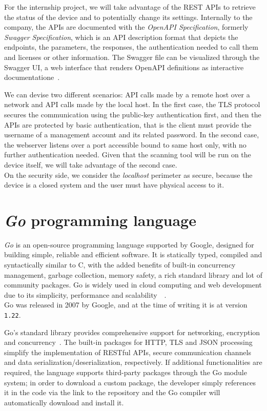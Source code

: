 For the internship project, we will take advantage of the REST APIs to retrieve the status of the device and to potentially change its settings. Internally to the company, the APIs are documented with the \textit{OpenAPI Specification}, formerly \textit{Swagger Specification}, which is an API description format that depicts the endpoints, the parameters, the responses, the authentication needed to call them and licenses or other information. The Swagger file can be visualized through the Swagger UI, a web interface that renders OpenAPI definitions as interactive documentatione~\cite{openapi-swagger}.

We can devise two different scenarios: API calls made by a remote host over a network and API calls made by the local host. In the first case, the TLS protocol secures the communication using the public-key authentication first, and then the APIs are protected by basic authentication, that is the client must provide the username of a management account and its related password. In the second case, the webserver listens over a port accessible bound to same host only, with no further authentication needed. Given that the scanning tool will be run on the device itself, we will take advantage of the second case. \\
On the security side, we consider the \textit{localhost} perimeter as secure, because the device is a closed system and the user must have physical access to it.

\section{\textit{Go} programming language}
\label{sec:go-lang}

\textit{Go} is an open-source programming language supported by Google, designed for building simple, reliable and efficient software. It is statically typed, compiled and syntactically similar to C, with the added benefits of built-in concurrency management, garbage collection, memory safety, a rich standard library and lot of community packages. Go is widely used in cloud computing and web development due to its simplicity, performance and scalability~\cite{go-lang-site}~\cite{go-lang-wikipedia}.\\
Go was released in 2007 by Google, and at the time of writing it is at version \texttt{1.22}.

Go's standard library provides comprehensive support for networking, encryption and concurrency~\cite{go-package-std}. The built-in packages for HTTP, TLS and JSON processing simplify the implementation of RESTful APIs, secure communication channels and data serialization/deserialization, respectively. If additional functionalities are required, the language supports third-party packages through the Go module system; in order to download a custom package, the developer simply references it in the code via the link to the repository and the Go compiler will automatically download and install it.

